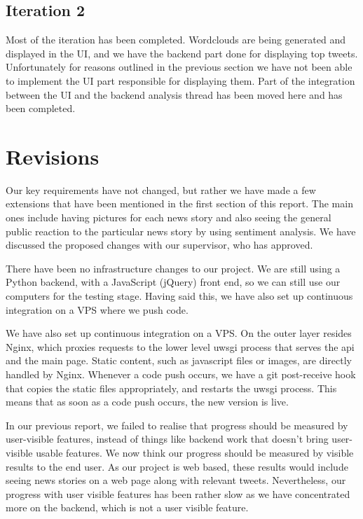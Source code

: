 \documentclass[a4paper,12pt]{article}
\begin{document}
	\subsection{Iteration 2}
	Most of the iteration has been completed. Wordclouds are being generated and displayed in the UI, and we have the backend part done for displaying top tweets. Unfortunately for reasons outlined in the previous section we have not been able to implement the UI part responsible for displaying them. Part of the integration between the UI and the backend analysis thread has been moved here and has been completed.
	
	\section{Revisions}
	
	Our key requirements have not changed, but rather we have made a few extensions that have been mentioned in the first section of this report. The main ones include having pictures for each news story and also seeing the general public reaction to the particular news story by using sentiment analysis. We have discussed the proposed changes with our supervisor, who has approved.
  
  There have been no infrastructure changes to our project. We are still using a Python backend, with a JavaScript (jQuery) front end, so we can still use our computers for the testing stage. Having said this, we have also set up continuous integration on a VPS where we push code.

	We have also set up continuous integration on a VPS. On the outer layer resides Nginx, which proxies requests to the lower level uwsgi process that serves the api and the main page. Static content, such as javascript files or images, are directly handled by Nginx. Whenever a code push occurs, we have a git post-receive hook that copies the static files appropriately, and restarts the uwsgi process. This means that as soon as a code push occurs, the new version is live.
  
	In our previous report, we failed to realise that progress should be measured by user-visible features, instead of things like backend work that doesn't bring user-visible usable features. We now think our progress should be measured by visible results to the end user. As our project is web based, these results would include seeing news stories on a web page along with relevant tweets. Nevertheless, our progress with user visible features has been rather slow as we have concentrated more on the backend, which is not a user visible feature.
\end{document}
